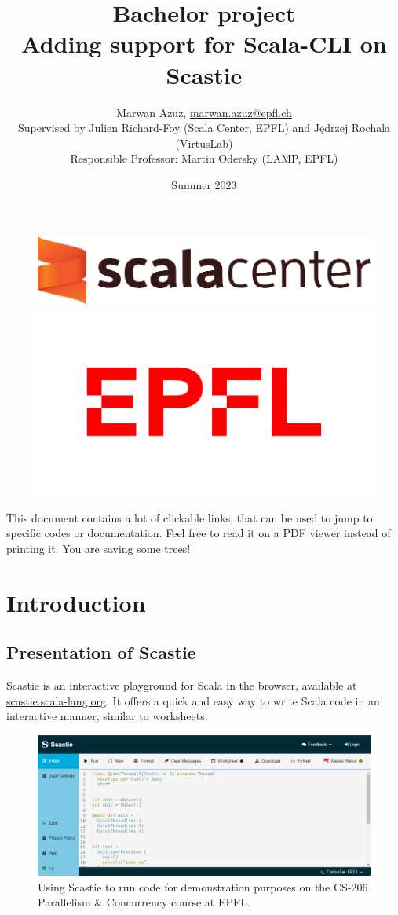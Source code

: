 \documentclass{article}
\title{Bachelor project\\Adding support for Scala-CLI on Scastie}
\date{Summer 2023}
\author{Marwan Azuz, \href{mailto:marwan.azuz@epfl.ch}{marwan.azuz@epfl.ch}
\\ Supervised by Julien Richard-Foy (Scala Center, EPFL) and Jędrzej Rochala (VirtusLab) \\ Responsible Professor: Martin Odersky (LAMP, EPFL)}
\begin{document}
\begin{titlingpage}
\maketitle

\begin{figure}[ht]
    \includegraphics[align=c,width=.4\linewidth]{logos/scala-center-logo-black@2x.png}
    \hfill
    \includegraphics[align=c,width=.4\linewidth]{logos/epfl.png}
\end{figure}
\end{titlingpage}

\newpage


This document contains a lot of clickable links, that can be used to jump to specific codes or documentation.
Feel free to read it on a PDF viewer instead of printing it. You are saving some trees!


\tableofcontents

\section{Introduction}


\subsection{Presentation of Scastie}

Scastie is an interactive playground for Scala in the browser, available at \href{https://scastie.scala-lang.org/}{scastie.scala-lang.org}.
It offers a quick and easy way to write Scala code in an interactive manner, similar to worksheets.

\begin{figure}[H]
    \centering
    \includegraphics[width=0.7\columnwidth]{scastie_main.png}
    
    \caption{Using Scastie to run code for demonstration purposes on the CS-206 Parallelism \& Concurrency course at EPFL.}
\end{figure}
\end{document}
